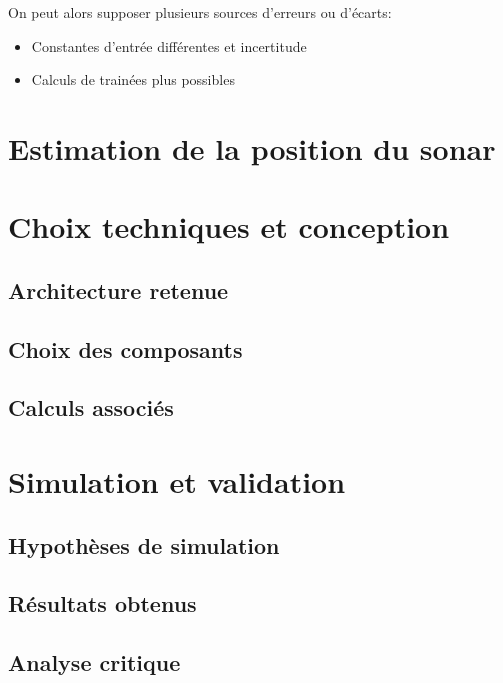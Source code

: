 \documentclass[12pt,a4paper]{report}
\begin{document}
On peut alors supposer plusieurs sources d'erreurs ou d'écarts:
\begin{itemize}
  \item Constantes d'entrée différentes et incertitude
  \item Calculs de trainées plus possibles
\end{itemize}


\section{Estimation de la position du sonar}




\section{Choix techniques et conception}

\subsection{Architecture retenue}
\subsection{Choix des composants}
\subsection{Calculs associés}





\section{Simulation et validation}

\subsection{Hypothèses de simulation}
\subsection{Résultats obtenus}
\subsection{Analyse critique}
\end{document}
